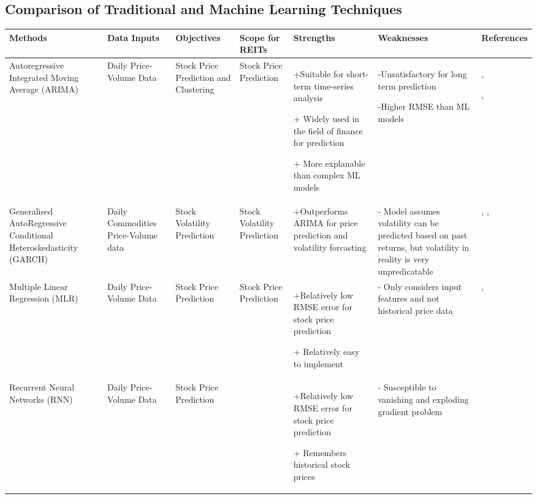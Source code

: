 \documentclass[a4paper,12pt]{report}
\numberwithin{equation}{section}
\theoremstyle{definition}
\begin{document}
\begin{landscape}
  
  \titlespacing{\section}{0pt}{-150pt}{0cm}%
  \section{Comparison of Traditional and Machine Learning Techniques}
  \begin{table}[H]
    \begin{adjustwidth}{-1.9cm}{-1.9cm}
    \begin{tabular}{|p{2.6cm}|p{2.7cm}|p{2.7cm}|p{3.5cm}|p{5cm}|p{5cm}|p{4cm}|}
    \hline
    \textbf{Methods} & \textbf{Data Inputs} & \textbf{Objectives} & \textbf{Scope for REITs} & \textbf{Strengths} & \textbf{Weaknesses} & \textbf{References}  
    \\ \hline Autoregressive Integrated Moving Average (ARIMA) & Daily Price-Volume Data & Stock Price Prediction and Clustering & Stock Price Prediction & +Suitable for short-term time-series analysis \par+ Widely used in the field of finance for prediction \par+ More explanable than complex ML models & \par-Unsatisfactory for long term prediction \par-Higher RMSE than ML models   & \cite{ariyo_stock_2014},\par \cite{habbab_machine_2022},\par   \cite{obthong_survey_2020}         
    \\ \hline Generalised AutoRegressive Conditional Heteroskedasticity (GARCH) & Daily Commodities Price-Volume data & Stock Volatility Prediction & Stock Volatility Prediction & +Outperforms ARIMA for price prediction and volatility forcasting & - Model assumes volatility can be predicted based on past returns, but volatility in reality is very unpredicatable & \cite{fiszeder_what_2020},   \cite{lama_modelling_2015}, \cite{yuan_garch_2017}           
    \\ \hline Multiple Linear Regression (MLR) & Daily Price-Volume Data & Stock Price Prediction & Stock Price Prediction & +Relatively low RMSE error for stock price prediction \par+ Relatively easy to implement & - Only considers input features and not historical price data  & \cite{obthong_survey_2020}, \cite{shakhla_stock_2020}
    \\ \hline \rowcolor[gray]{.8}Recurrent Neural Networks (RNN) & Daily Price-Volume Data & Stock Price Prediction & & +Relatively low RMSE error for stock price prediction\par + Remembers historical stock prices & - Susceptible to vanishing and exploding gradient problem & \cite{dey_comparative_2021} 
    \\ \hline
    \end{tabular}
  \end{adjustwidth}
  \end{table}

\end{landscape}
\end{document}
